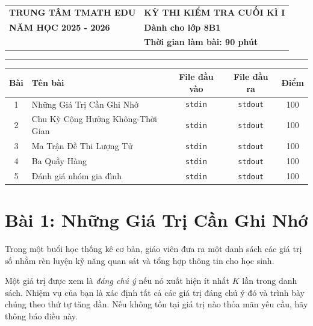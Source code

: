 \begin{tabularx}{\textwidth}{>{\centering\arraybackslash}X >{\centering\arraybackslash}X}
\textbf{TRUNG TÂM TMATH EDU} &
\textbf{KỲ THI KIỂM TRA CUỐI KÌ I} \\

\textbf{NĂM HỌC 2025 - 2026} &
\textbf{Dành cho lớp 8B1} \\

\fbox{\begin{minipage}{2.8cm}
\centering
\textbf{ĐỀ SỐ 1}
\end{minipage}} &
\textbf{Thời gian làm bài: 90 phút} \\
\end{tabularx}

\vspace{0.3cm}
\hrule
\vspace{0.6cm}

\renewcommand{\arraystretch}{1.2}
\begin{tabularx}{\textwidth}{|c|X|c|c|c|}
\hline
\textbf{Bài} & \textbf{Tên bài} & \textbf{File đầu vào} & \textbf{File đầu ra} & \textbf{Điểm} \\
\hline
1 & Những Giá Trị Cần Ghi Nhớ & \texttt{stdin} & \texttt{stdout} & 100 \\
\hline
2 & Chu Kỳ Cộng Hưởng Không-Thời Gian & \texttt{stdin} & \texttt{stdout} & 100 \\
\hline
3 & Ma Trận Đề Thi Lượng Tử & \texttt{stdin} & \texttt{stdout} & 100 \\
\hline
4 & Ba Quầy Hàng & \texttt{stdin} & \texttt{stdout} & 100 \\
\hline
5 & Đánh giá nhóm gia đình & \texttt{stdin} & \texttt{stdout} & 100 \\
\hline
\end{tabularx}

\section*{Bài 1: Những Giá Trị Cần Ghi Nhớ}

Trong một buổi học thống kê cơ bản, giáo viên đưa ra một danh sách các giá trị số nhằm rèn luyện kỹ năng quan sát và tổng hợp thông tin cho học sinh.

Một giá trị được xem là \emph{đáng chú ý} nếu nó xuất hiện ít nhất $K$ lần trong danh sách.
Nhiệm vụ của bạn là xác định tất cả các giá trị đáng chú ý đó và trình bày chúng theo thứ tự tăng dần.
Nếu không tồn tại giá trị nào thỏa mãn yêu cầu, hãy thông báo điều này.

